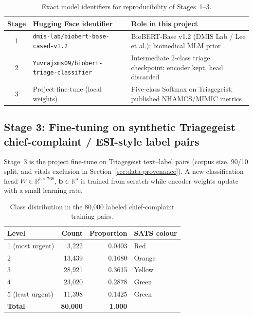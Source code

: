 \begin{table}[H]
\centering
\small
\begin{tabularx}{\textwidth}{|c|>{\raggedright\arraybackslash}X|>{\raggedright\arraybackslash}X|}
\hline
\textbf{Stage} & \textbf{Hugging Face identifier} & \textbf{Role in this project} \\
\hline
1 & \texttt{dmis-lab/\allowbreak{}biobert-base-\allowbreak{}cased-v1.2} & BioBERT-Base v1.2 (DMIS Lab / Lee et al.); biomedical MLM prior \citep{lee2020biobert,dmisbiobertv12} \\
2 & \texttt{Yuvrajxms09/\allowbreak{}biobert-triage-\allowbreak{}classifier} & Intermediate 2-class triage checkpoint; encoder kept, head discarded \citep{yuvrajbioberttriage} \\
3 & Project fine-tune (local weights) & Five-class Softmax on Triagegeist; published NHAMCS/MIMIC metrics \\
\hline
\end{tabularx}
\caption{Exact model identifiers for reproducibility of Stages~1--3.}
\label{tab:model-ids}
\end{table}

\subsection{Stage 3: Fine-tuning on synthetic Triagegeist chief-complaint / ESI-style label pairs}
\label{sec:training}

Stage~3 is the project fine-tune on Triagegeist text--label pairs (corpus size, 90/10 split, and vitals exclusion in Section~\ref{sec:data-provenance}). A new classification head \(W \in \mathbb{R}^{5 \times 768}\), \(\mathbf{b} \in \mathbb{R}^{5}\) is trained from scratch while encoder weights update with a small learning rate.

\begin{table}[H]
\centering
\small
\begin{tabular}{|l|r|r|l|}
\hline
\textbf{Level} & \textbf{Count} & \textbf{Proportion} & \textbf{SATS colour} \\
\hline
1 (most urgent) & 3,222 & 0.0403 & Red \\
2 & 13,439 & 0.1680 & Orange \\
3 & 28,921 & 0.3615 & Yellow \\
4 & 23,020 & 0.2878 & Green \\
5 (least urgent) & 11,398 & 0.1425 & Green \\
\hline
\textbf{Total} & \textbf{80,000} & \textbf{1.000} & \\
\hline
\end{tabular}
\caption{Class distribution in the 80{,}000 labeled chief-complaint training pairs.}
\label{tab:class-distribution}
\end{table}

